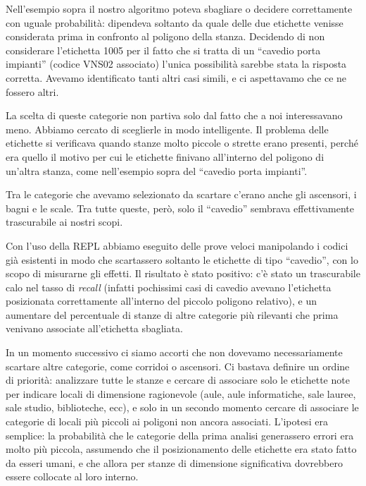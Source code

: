 \documentclass[12pt]{report}
\begin{document}
Nell'esempio sopra il nostro algoritmo poteva sbagliare o decidere 
correttamente con uguale probabilità: dipendeva soltanto da quale 
delle due etichette venisse considerata prima in confronto al 
poligono della stanza. Decidendo di non considerare l'etichetta 
1005 per il fatto che si tratta di un ``cavedio porta impianti'' 
(codice VNS02 associato) l'unica possibilità sarebbe stata
la risposta corretta. Avevamo identificato tanti altri casi simili, e
ci aspettavamo che ce ne fossero altri.

La scelta di queste categorie non partiva solo dal fatto che a noi
interessavano meno. Abbiamo cercato di sceglierle
in modo intelligente. Il problema delle etichette si verificava
quando stanze molto piccole o strette erano presenti,
perché era quello il motivo per cui le etichette finivano all'interno del
poligono di un'altra stanza, come nell'esempio sopra 
del ``cavedio porta impianti''.

Tra le categorie che avevamo selezionato da scartare c'erano anche 
gli ascensori, i bagni e le scale.
Tra tutte queste, però, solo il ``cavedio'' sembrava effettivamente
trascurabile ai nostri scopi.

Con l'uso della REPL abbiamo eseguito delle prove veloci manipolando i
codici già esistenti in modo che scartassero soltanto le etichette di
tipo ``cavedio'', con lo scopo di misurarne gli effetti.
Il risultato è stato positivo: c'è stato un
trascurabile calo nel tasso di \textit{recall} (infatti pochissimi casi
di cavedio avevano l'etichetta posizionata correttamente all'interno del
piccolo poligono relativo), e un aumentare del percentuale di stanze
di altre categorie più rilevanti che prima venivano associate 
all'etichetta sbagliata.

In un momento successivo ci siamo accorti che non dovevamo necessariamente
scartare altre categorie, come corridoi o ascensori. Ci bastava definire un
ordine di priorità: analizzare tutte le stanze e cercare di associare solo
le etichette note per indicare locali di dimensione ragionevole (aule, aule
informatiche, sale lauree, sale studio, biblioteche, ecc), e solo in un 
secondo momento cercare di associare le categorie di locali più piccoli ai
poligoni non ancora associati. L'ipotesi era semplice: la probabilità
che le categorie della prima analisi generassero errori
era molto più piccola, assumendo che il posizionamento delle etichette
era stato fatto da esseri umani, e che allora per stanze di dimensione
significativa dovrebbero essere collocate al loro interno.
\end{document}
